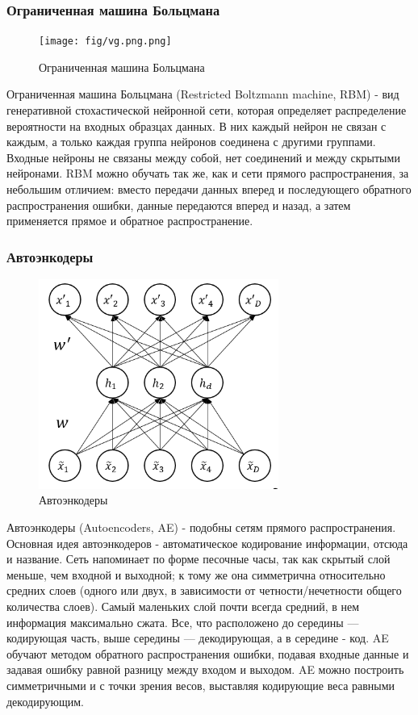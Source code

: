 \subsubsection{Ограниченная машина Больцмана}
\begin{figure}[htbp]
\centering
\caption{Ограниченная машина Больцмана}
\texttt{[image: fig/vg.png.png]}
\end{figure}
Ограниченная машина Больцмана (Restricted Boltzmann machine, RBM) - вид генеративной стохастической нейронной сети, которая определяет распределение вероятности на входных образцах данных. В них каждый нейрон не связан с каждым, а только каждая группа нейронов соединена с другими группами. Входные нейроны не связаны между собой, нет соединений и между скрытыми нейронами. RBM можно обучать так же, как и сети прямого распространения, за небольшим отличием: вместо передачи данных вперед и последующего обратного распространения ошибки, данные передаются вперед и назад, а затем применяется прямое и обратное распространение.

\subsubsection{Автоэнкодеры}
\begin{figure}[htbp]
\centering
\caption{Автоэнкодеры}
\includegraphics[width=0.7\textwidth]{fig/AE}
\end{figure}
Автоэнкодеры (Autoencoders, AE) - подобны сетям прямого распространения. Основная идея автоэнкодеров - автоматическое кодирование информации, отсюда и название. Сеть напоминает по форме песочные часы, так как скрытый слой меньше, чем входной и выходной; к тому же она симметрична относительно средних слоев (одного или двух, в зависимости от четности/нечетности общего количества слоев). Самый маленьких слой почти всегда средний, в нем информация максимально сжата. Все, что расположено до середины — кодирующая часть, выше середины — декодирующая, а в середине - код. AE обучают методом обратного распространения ошибки, подавая входные данные и задавая ошибку равной разницу между входом и выходом. AE можно построить симметричными и с точки зрения весов, выставляя кодирующие веса равными декодирующим.


